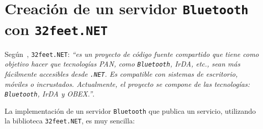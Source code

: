 \chapter{Creación de un servidor \texttt{Bluetooth} con \texttt{32feet.NET}}
\label{chap:32feet}

Según~\cite{bib:32feet}, \texttt{32feet.NET}: \emph{``es un proyecto de código 
fuente compartido que tiene como objetivo hacer que tecnologías \acs{PAN}, como 
\texttt{Bluetooth}, \acs{IrDA}, etc., sean más fácilmente accesibles desde 
\texttt{.NET}. Es compatible con sistemas de escritorio, móviles o incrustados.
Actualmente, el proyecto se compone de las tecnologías: \texttt{Bluetooth},
\acs{IrDA} y \acs{OBEX}.''}.

La implementación de un servidor \texttt{Bluetooth} que publica un servicio,
utilizando la biblioteca \texttt{32feet.NET}, es muy sencilla:
